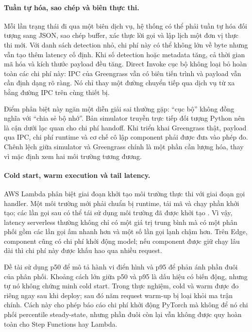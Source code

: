 \paragraph{Tuần tự hóa, sao chép và biên thực thi.}

Mỗi lần trạng thái đi qua một biên dịch vụ, hệ thống có thể phải tuần tự hóa đối
tượng sang JSON, sao chép buffer, xác thực lời gọi và lập lịch một đơn vị thực thi
mới. Với danh sách detection nhỏ, chi phí này có thể không lớn về byte nhưng vẫn
tạo thêm latency cố định. Khi số detection hoặc metadata tăng, cả thời gian mã hóa
và kích thước payload đều tăng. Direct Invoke cục bộ không loại bỏ hoàn toàn các
chi phí này: IPC của Greengrass vẫn có biên tiến trình và payload vẫn cần định dạng
rõ ràng. Nó chỉ thay một đường chuyển tiếp qua dịch vụ từ xa bằng đường IPC trên
cùng thiết bị.

Điểm phân biệt này ngăn một diễn giải sai thường gặp: ``cục bộ'' không đồng nghĩa
với ``chia sẻ bộ nhớ''. Bản simulator truyền trực tiếp đối tượng Python nên là cận
dưới lạc quan cho chi phí handoff. Khi triển khai Greengrass thật, payload qua IPC,
chi phí runtime và cơ chế cô lập component phải được đưa vào phép đo. Chênh lệch
giữa simulator và Greengrass chính là một phần cần lượng hóa, thay vì mặc định xem
hai môi trường tương đương.

\paragraph{Cold start, warm execution và tail latency.}

AWS Lambda phân biệt giai đoạn khởi tạo môi trường thực thi với giai đoạn gọi
handler. Một môi trường mới phải chuẩn bị runtime, tải mã và chạy phần khởi tạo;
các lần gọi sau có thể tái sử dụng môi trường đã được khởi tạo
\cite{awsLambdaLifecycle}. Vì vậy, latency serverless thường không chỉ có một giá
trị trung bình mà có một phân phối gồm các lần gọi ấm nhanh hơn và một số lần gọi
lạnh chậm hơn. Trên Edge, component cũng có chi phí khởi động model; nếu component
được giữ chạy lâu dài thì chi phí này được khấu hao qua nhiều request.

Đề tài sử dụng p50 để mô tả hành vi điển hình và p95 để phản ánh phần đuôi của phân
phối. Khoảng cách lớn giữa p50 và p95 là dấu hiệu có biến động, nhưng tự nó không
chứng minh cold start. Trong thực nghiệm, cold và warm được đo riêng ngay sau khi
deploy; sau đó năm request warm-up bị loại khỏi ma trận chính. Cách này cho phép
báo cáo chi phí khởi động PyTorch mà không để nó chi phối percentile steady-state,
nhưng phần đuôi còn lại vẫn không được quy hoàn toàn cho Step Functions hay Lambda.

